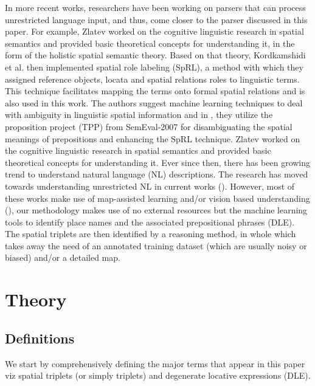 \documentclass{acm_proc_article-sp}
\begin{document}
In more recent works, researchers have been working on parsers that can process unrestricted language input, and thus, come closer to the parser discussed in this paper. For example, Zlatev \cite{zlatev:semantics} worked on the cognitive linguistic research in spatial semantics and provided basic theoretical concepts for understanding it, in the form of the holistic spatial semantic theory. Based on that theory, Kordkamshidi et al. \cite{kordjamshidi:language} then implemented spatial role labeling (SpRL), a method with which they assigned reference objects, locata and spatial relations roles to linguistic terms. This technique facilitates mapping the terms onto formal spatial relations and is also used in this work. The authors suggest machine learning techniques to deal with ambiguity in linguistic spatial information and in \cite{Kordjamshidi:labelling}, they utilize the proposition project (TPP) from SemEval-2007 \cite{litkowski:semeval} for disambiguating the spatial meanings of prepositions and enhancing the SpRL technique.
Zlatev \cite{zlatev:semantics} worked on the cognitive linguistic research in spatial semantics and provided basic theoretical concepts for understanding it. Ever since then, there has been growing trend to understand natural language (NL) descriptions. The research has moved towards understanding unrestricted NL in current works (\cite{Kordjamshidi:labelling, matuszek:following, tellex:language}). However, most of these works make use of map-assisted learning and/or vision based understanding (\cite{kollar:robotic,levit:interpretation,macmahon:walk}), our methodology makes use of no external resources but the machine learning tools \cite{fei:locative} to identify place names and the associated prepositional phrases (DLE). The spatial triplets are then identified by a reasoning method, in whole which takes away the need of an annotated training dataset (which are usually noisy or biased) and/or a detailed map. 
\section{Theory}
\subsection{Definitions}
We start by comprehensively defining the major terms that appear in this paper viz spatial triplets (or simply triplets) and degenerate locative expressions (DLE).
\end{document}
